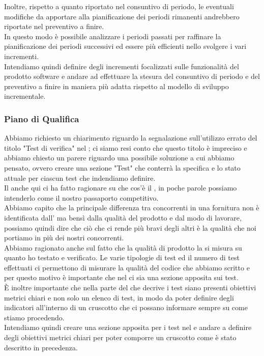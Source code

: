 	Inoltre, rispetto a quanto riportato nel consuntivo di periodo, le eventuali modifiche da apportare alla pianificazione dei periodi rimanenti andrebbero riportate nel preventivo a finire. \\
	In questo modo è possibile analizzare i periodi passati per raffinare la pianificazione dei periodi successivi ed essere più efficienti nello svolgere i vari incrementi. \\
	Intendiamo quindi definire degli incrementi focalizzati sulle funzionalità del prodotto software e andare ad effettuare la stesura del consuntivo di periodo e del preventivo a finire in maniera più adatta rispetto al modello di sviluppo incrementale.
	 
	
	\subsubsection*{Piano di Qualifica}
	Abbiamo richiesto un chiarimento riguardo la segnalazione sull'utilizzo errato del titolo "Test di verifica" nel \PdQ ; ci siamo resi conto che questo titolo è impreciso e abbiamo chiesto un parere riguardo una possibile soluzione a cui abbiamo pensato, ovvero creare una sezione "Test" che conterrà la specifica e lo stato attuale per ciascun test che indendiamo definire. \\
	Il \TV{} anche qui ci ha fatto ragionare su che cos'è il \PdQ, in poche parole possiamo intenderlo come il nostro passaporto competitivo. \\
	Abbiamo capito che la principale differenza tra concorrenti in una fornitura non è identificata dall'\AdR{} ma bensì dalla qualità del prodotto e dal modo di lavorare, possiamo quindi dire che ciò che ci rende più bravi degli altri è la qualità che noi portiamo in più dei nostri concorrenti. \\
	Abbiamo ragionato anche sul fatto che la qualità di prodotto la si misura su quanto ho testato e verificato. Le varie tipologie di test ed il numero di test effettuati ci permettono di misurare la qualità del codice che abbiamo scritto e per questo motivo è importante che nel \PdQ{} ci sia una sezione apposita sui test. \\
	È inoltre importante che nella parte del \PdQ{} che decrive i test siano presenti obiettivi metrici chiari e non solo un elenco di test, in modo da poter definire degli indicatori all'interno di un cruscotto che ci possano informare sempre su come stiamo procedendo. \\
	Intendiamo quindi creare una sezione apposita per i test nel \PdQ{} e andare a definire degli obiettivi metrici chiari per poter comporre un cruscotto come è stato descritto in precedenza.
	
